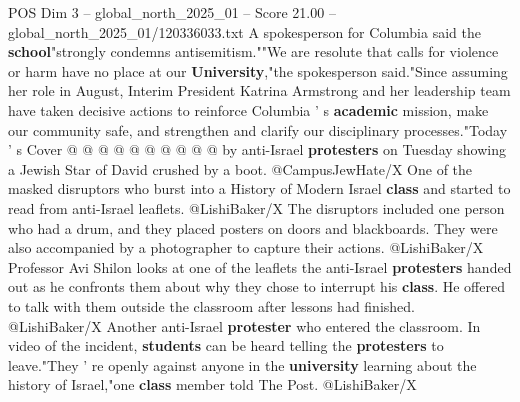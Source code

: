 \begin{textsample}{POS Dim 3 – global\_north\_2025\_01 – Score 21.00 – global\_north\_2025\_01/120336033.txt}
A spokesperson for Columbia said the \textbf{school}"strongly condemns antisemitism.""We are resolute that calls for violence or harm have no place at our \textbf{University},"the spokesperson said."Since assuming her role in August, Interim President Katrina Armstrong and her leadership team have taken decisive actions to reinforce Columbia ' s \textbf{academic} mission, make our community safe, and strengthen and clarify our disciplinary processes."Today ' s Cover @ @ @ @ @ @ @ @ @ @ by anti-Israel \textbf{protesters} on Tuesday showing a Jewish Star of David crushed by a boot. @CampusJewHate/X One of the masked disruptors who burst into a History of Modern Israel \textbf{class} and started to read from anti-Israel leaflets. @LishiBaker/X The disruptors included one person who had a drum, and they placed posters on doors and blackboards.
They were also accompanied by a photographer to capture their actions. @LishiBaker/X Professor Avi Shilon looks at one of the leaflets the anti-Israel \textbf{protesters} handed out as he confronts them about why they chose to interrupt his \textbf{class}.
He offered to talk with them outside the classroom after lessons had finished. @LishiBaker/X Another anti-Israel \textbf{protester} who entered the classroom.
In video of the incident, \textbf{students} can be heard telling the \textbf{protesters} to leave."They ' re openly against anyone in the \textbf{university} learning about the history of Israel,"one \textbf{class} member told The Post. @LishiBaker/X

\end{textsample}
